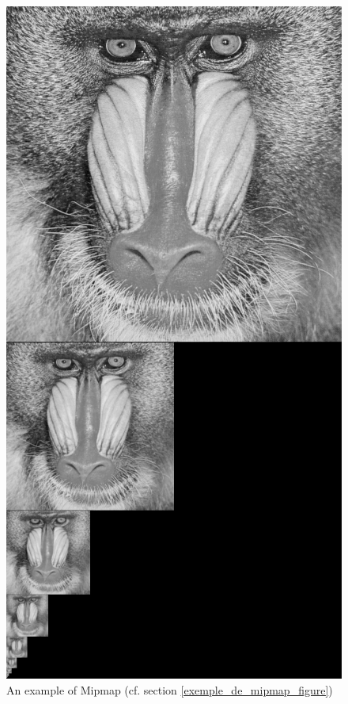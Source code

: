 \label{exemple_de_mipmap_figure}
\begin{figure}[h!]
\centering
\includegraphics[scale=0.4]{MipMap_real} %
\caption{An example of Mipmap (cf. section \ref{exemple_de_mipmap_figure})}
\label{MipMap_real}
\end{figure}

